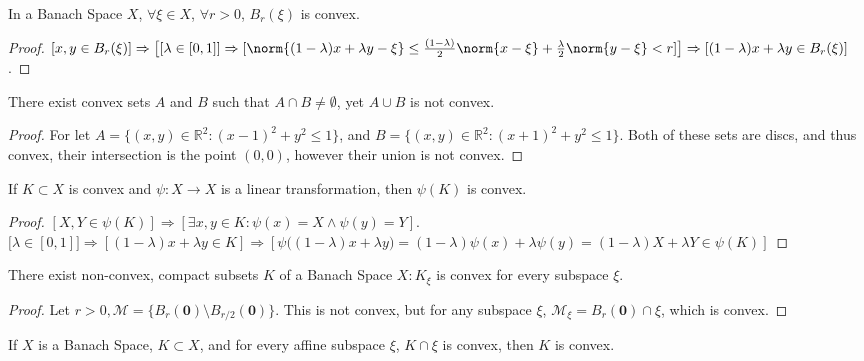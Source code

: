 \documentclass[crop=false,class=article,oneside]{standalone}
\begin{document}
        \begin{lemma}
        In a Banach Space $X$, $\forall \xi \in X$, $\forall r>0$, $B_{r}(\xi)$ is convex.
        \end{lemma}
        \begin{proof}
        $[x,y\in B_{r}(\xi)]\Rightarrow\big[[\lambda \in [0,1]]\Rightarrow [\norm{(1-\lambda)x+\lambda y-\xi}\leq \frac{(1-\lambda)}{2}\norm{x-\xi}+\frac{\lambda}{2} \norm{y-\xi}< r]\big]\Rightarrow [(1-\lambda)x+\lambda y \in B_{r}(\xi)]$.
        \end{proof}
        \begin{theorem}
        There exist convex sets $A$ and $B$ such that $A\cap B \ne \emptyset$, yet $A\cup B$ is not convex.
        \end{theorem}
        \begin{proof}
        For let $A = \{(x,y)\in \mathbb{R}^2: (x-1)^2+y^2\leq 1\}$, and $B = \{(x,y)\in \mathbb{R}^2:(x+1)^2+y^2\leq 1\}$. Both of these sets are discs, and thus convex, their intersection is the point $(0,0)$, however their union is not convex.
        \end{proof}
        \begin{theorem}
        If $K\subset X$ is convex and $\psi:X\rightarrow X$ is a linear transformation, then $\psi(K)$ is convex.
        \end{theorem}
        \begin{proof}
        $[X,Y\in \psi(K)]\Rightarrow [\exists x,y\in K:\psi(x)=X\land \psi(y)=Y]$. $\big[\lambda \in [0,1]\big]\Rightarrow [(1-\lambda)x+\lambda y\in K]\Rightarrow [\psi\big((1-\lambda)x+\lambda y\big)=(1-\lambda)\psi(x)+\lambda\psi(y) = (1-\lambda)X+\lambda Y \in \psi(K)]$
        \end{proof}
        \begin{theorem}
        There exist non-convex, compact subsets $K$ of a Banach Space $X: K_{\xi}$ is convex for every subspace $\xi$.
        \end{theorem}
        \begin{proof}
        Let $r>0, \mathcal{M} = \{B_{r}(\mathbf{0})\setminus B_{r/2}(\mathbf{0})\}$. This is not convex, but for any subspace $\xi$, $\mathcal{M}_{\xi} = B_{r}(\mathbf{0})\cap \xi$, which is convex.
        \end{proof}
        \begin{theorem}
        If $X$ is a Banach Space, $K\subset X$, and for every affine subspace $\xi$, $K\cap \xi$ is convex, then $K$ is convex.
        \end{theorem}
\end{document}
